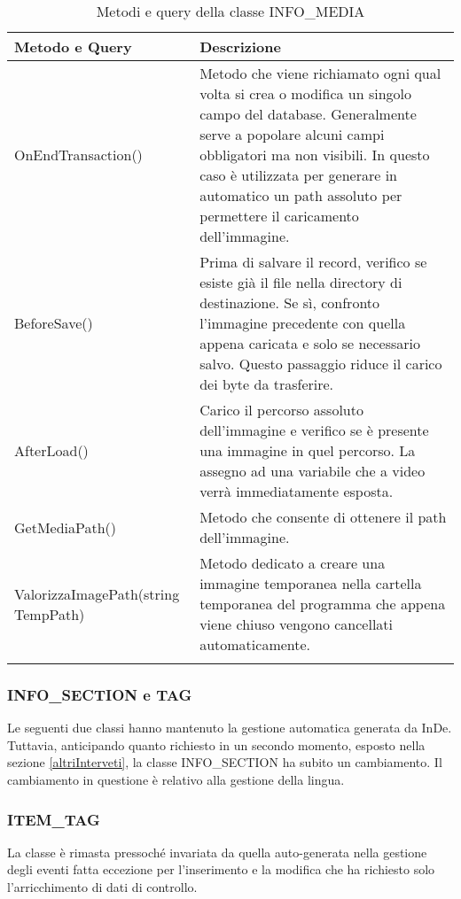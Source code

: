 	
		\begin{longtable}{ p{}|p{8cm} }
			\hline
			\textbf{Metodo e Query} & \textbf{Descrizione}\\
			\hline
			OnEndTransaction() & Metodo che viene richiamato ogni qual volta si crea o modifica un singolo campo del database. Generalmente serve a popolare alcuni campi obbligatori ma non visibili. In questo caso è utilizzata per generare in automatico un path assoluto per permettere il caricamento dell'immagine. \\
			\hline
			BeforeSave()	& Prima di salvare il record, verifico se esiste già il file nella directory di destinazione. Se sì, confronto l'immagine precedente con quella appena caricata e solo se necessario salvo. Questo passaggio riduce il carico dei byte da trasferire.\\
			\hline
			AfterLoad()	& Carico il percorso assoluto dell'immagine e verifico se è presente una immagine in quel percorso. La assegno ad una variabile che a video verrà immediatamente esposta.\\
			\hline
			GetMediaPath()& Metodo che consente di ottenere il path dell'immagine.\\
			\hline
			ValorizzaImagePath(string TempPath)	& Metodo dedicato a creare una immagine temporanea nella cartella temporanea del programma che appena viene chiuso vengono cancellati automaticamente.\\
	\caption{Metodi e query della classe INFO\_MEDIA}	
		\end{longtable}
	
	


\subsubsection{INFO\_SECTION e TAG}
Le seguenti due classi hanno mantenuto la gestione automatica generata da InDe. Tuttavia, anticipando quanto richiesto in un secondo momento, esposto nella sezione \ref{altriInterveti}, la classe INFO\_SECTION ha subito un cambiamento. Il cambiamento in questione è relativo alla gestione della lingua.

\newpage

\subsubsection{ITEM\_TAG}
La classe è rimasta pressoché invariata da quella auto-generata nella gestione degli eventi fatta eccezione per l'inserimento e la modifica che ha richiesto solo l'arricchimento di dati di controllo.



